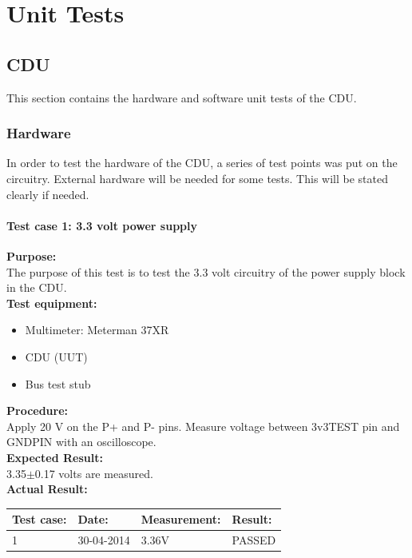 \chapter{Unit Tests}
\section{CDU}
This section contains the hardware and software unit tests of the CDU.
\subsection{Hardware}
In order to test the hardware of the CDU, a series of test points was put on the circuitry. External hardware will be needed for some tests. This will be stated clearly if needed.
\subsubsection{Test case 1: 3.3 volt power supply}
\textbf{Purpose:}\\
The purpose of this test is to test the 3.3 volt circuitry of the power supply block in the CDU.\\

\textbf{Test equipment:}
\begin{itemize}
\item Multimeter: Meterman 37XR
\item CDU (UUT)
\item Bus test stub
\end{itemize}

\textbf{Procedure:}\\
Apply 20 V on the P+ and P- pins. Measure voltage between 3v3TEST pin and GNDPIN with an oscilloscope.\\

\textbf{Expected Result:}\\
3.35$\pm$0.17 volts are measured.\\

\textbf{Actual Result:}\\
\begin{table}[H]
\centering
\begin{tabular}{|p{2cm}|p{2cm}|p{3cm}|p{2cm}|}\hline
\textbf{Test case:} & \textbf{Date:} & \textbf{Measurement:} & \textbf{Result:} \\ \hline
1 & 30-04-2014 & 3.36V & PASSED \\ \hline
\end{tabular}
\end{table}

